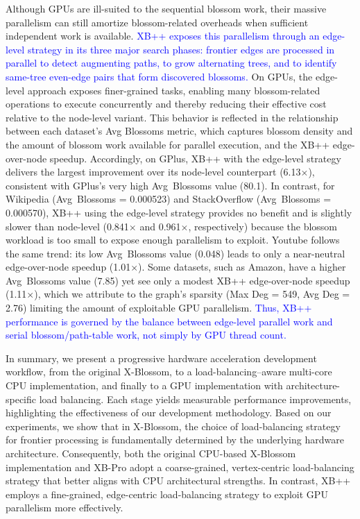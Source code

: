 Although GPUs are ill-suited to the sequential blossom work, their massive parallelism can still amortize blossom-related overheads when sufficient independent work is available. 
\label{para:xbpp-parallel-work}
\textcolor{blue}{XB++ exposes this parallelism through an edge-level strategy in its three major search phases: frontier edges are processed in parallel to detect augmenting paths, to grow alternating trees, and to identify same-tree even-edge pairs that form discovered blossoms.} 
On GPUs, the edge-level approach exposes finer-grained tasks, enabling many blossom-related operations to execute concurrently and thereby reducing their effective cost relative to the node-level variant. 
This behavior is reflected in the relationship between each dataset's Avg Blossoms metric, which captures blossom density and the amount of blossom work available for parallel execution, and the XB++ edge-over-node speedup. 
Accordingly, on GPlus, XB++ with the edge-level strategy delivers the largest improvement over its node-level counterpart (6.13$\times$), consistent with GPlus's very high Avg~Blossoms value (80.1). 
In contrast, for Wikipedia (Avg~Blossoms = 0.000523) and StackOverflow (Avg~Blossoms = 0.000570), XB++ using the edge-level strategy provides no benefit and is slightly slower than node-level (0.841$\times$ and 0.961$\times$, respectively) because the blossom workload is too small to expose enough parallelism to exploit. 
Youtube follows the same trend: its low Avg~Blossoms value (0.048) leads to only a near-neutral edge-over-node speedup (1.01$\times$).
Some datasets, such as Amazon, have a higher Avg~Blossoms value (7.85) yet see only a modest XB++ edge-over-node speedup (1.11$\times$), which we attribute to the graph's sparsity (Max Deg = 549, Avg Deg = 2.76) limiting the amount of exploitable GPU parallelism.
\textcolor{blue}{Thus, XB++ performance is governed by the balance between edge-level parallel work and serial blossom/path-table work, not simply by GPU thread count.}

In summary, we present a progressive hardware acceleration development workflow, from the original X-Blossom, to a load-balancing–aware multi-core CPU implementation, and finally to a GPU implementation with architecture-specific load balancing. Each stage yields measurable performance improvements, highlighting the effectiveness of our development methodology.
Based on our experiments, we show that in X-Blossom, the choice of load-balancing strategy for frontier processing is fundamentally determined by the underlying hardware architecture. Consequently, both the original CPU-based X-Blossom implementation and XB-Pro adopt a coarse-grained, vertex-centric load-balancing strategy that better aligns with CPU architectural strengths. In contrast, XB++ employs a fine-grained, edge-centric load-balancing strategy to exploit GPU parallelism more effectively.

